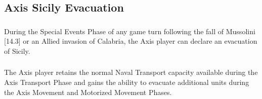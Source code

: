 \subsection{Axis Sicily Evacuation}

\subsubsection{} During the Special Events Phase of any game turn following the fall of Mussolini [14.3] or an Allied invasion of Calabria, the Axis player can declare an evacuation of Sicily.

\subsubsection{} The Axis player retains the normal Naval Transport capacity available during the Axis Transport Phase and gains the ability to evacuate additional units during the Axis Movement and Motorized Movement Phases.

